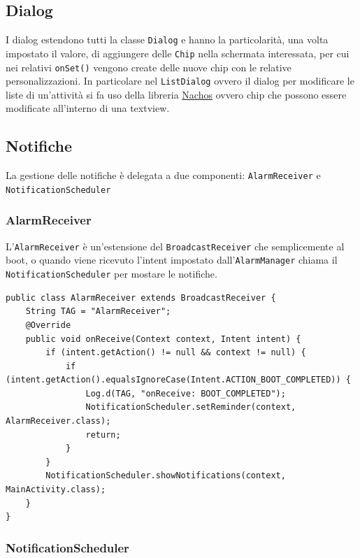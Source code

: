 \documentclass[]{article}
\begin{document}
\hypertarget{dialog-1}{%
\subsection{Dialog}\label{dialog-1}}

I dialog estendono tutti la classe \texttt{Dialog} e hanno la
particolarità, una volta impostato il valore, di aggiungere delle
\texttt{Chip} nella schermata interessata, per cui nei relativi
\texttt{onSet()} vengono create delle nuove chip con le relative
personalizzazioni. In particolare nel \texttt{ListDialog} ovvero il
dialog per modificare le liste di un'attività si fa uso della libreria
\href{https://github.com/hootsuite/nachos}{Nachos} ovvero chip che
possono essere modificate all'interno di una textview.

\hypertarget{notifiche-1}{%
\subsection{Notifiche}\label{notifiche-1}}

La gestione delle notifiche è delegata a due componenti:
\texttt{AlarmReceiver} e \texttt{NotificationScheduler}

\hypertarget{alarmreceiver}{%
\subsubsection{AlarmReceiver}\label{alarmreceiver}}

L'\texttt{AlarmReceiver} è un'estensione del \texttt{BroadcastReceiver}
che semplicemente al boot, o quando viene ricevuto l'intent impostato
dall'\texttt{AlarmManager} chiama il \texttt{NotificationScheduler} per
mostare le notifiche.

\begin{verbatim}
public class AlarmReceiver extends BroadcastReceiver {
    String TAG = "AlarmReceiver";
    @Override
    public void onReceive(Context context, Intent intent) {
        if (intent.getAction() != null && context != null) {
            if (intent.getAction().equalsIgnoreCase(Intent.ACTION_BOOT_COMPLETED)) {
                Log.d(TAG, "onReceive: BOOT_COMPLETED");
                NotificationScheduler.setReminder(context, AlarmReceiver.class);
                return;
            }
        }
        NotificationScheduler.showNotifications(context, MainActivity.class);
    }
}
\end{verbatim}

\hypertarget{notificationscheduler}{%
\subsubsection{NotificationScheduler}\label{notificationscheduler}}
\end{document}
